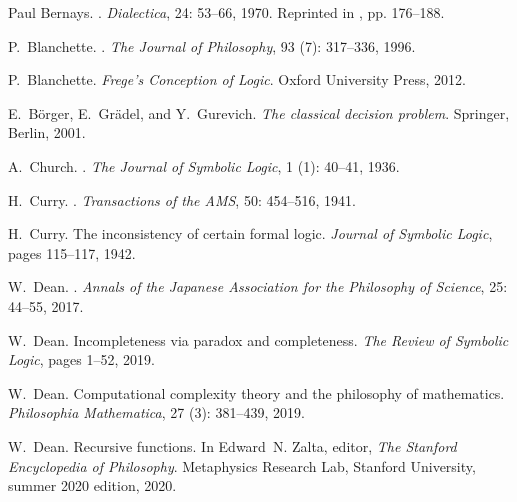 \documentclass[11pt,fleqn,leqno]{article}
\begin{document}
\begin{thebibliography}{118}
Paul Bernays.
.
\newblock \emph{Dialectica}, 24: 53--66, 1970.
\newblock Reprinted in \cite{Bernays1976}, pp. 176--188.

P.~Blanchette.
.
\newblock \emph{The Journal of Philosophy}, 93 (7): 317--336,
  1996.

P.~Blanchette.
\newblock \emph{Frege's Conception of Logic}.
\newblock Oxford University Press, 2012.

E.~B{\"o}rger, E.~Gr{\"a}del, and Y.~Gurevich.
\newblock \emph{The classical decision problem}.
\newblock Springer, Berlin, 2001.

A.~Church.
.
\newblock \emph{The Journal of Symbolic Logic}, 1 (1):
  40--41, 1936.

H.~Curry.
.
\newblock \emph{Transactions of the AMS}, 50: 454--516, 1941.

H.~Curry.
\newblock The inconsistency of certain formal logic.
\newblock \emph{Journal of Symbolic Logic}, pages 115--117, 1942.

W.~Dean.
.
\newblock \emph{Annals of the Japanese Association for the Philosophy of
  Science}, 25: 44--55, 2017.

W.~Dean.
\newblock Incompleteness via paradox and completeness.
\newblock \emph{The Review of Symbolic Logic}, pages 1--52, 2019{}.

W.~Dean.
\newblock Computational complexity theory and the philosophy of mathematics.
\newblock \emph{Philosophia Mathematica}, 27 (3): 381--439,
  2019{}.

W.~Dean.
\newblock Recursive functions.
\newblock In Edward~N. Zalta, editor, \emph{The Stanford Encyclopedia of
  Philosophy}. Metaphysics Research Lab, Stanford University, summer 2020
  edition, 2020.


\end{thebibliography}
\end{document}
